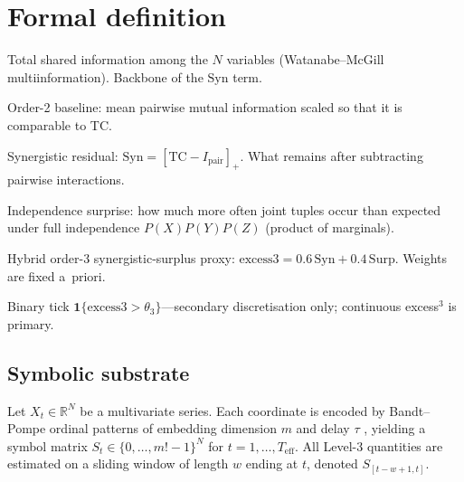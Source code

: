 \documentclass[11pt,a4paper]{article}
\begin{document}
\section{Formal definition}
\label{sec:definition}

\begin{tcolorbox}[
  colback=blue!5!white,
  colframe=blue!75!black,
  title={\textbf{Key definitions for excess$^3$}},
  fonttitle=\bfseries,
  boxrule=0.8pt,
  left=4pt,right=4pt,top=2pt,bottom=2pt,
  label=box:keydefs
]
\begin{description}[leftmargin=2.2em,itemsep=3pt,parsep=0pt,topsep=2pt]
  \item[TC (Total Correlation)]
    Total shared information among the $N$ variables
    (Watanabe--McGill multiinformation). Backbone of the $\mathrm{Syn}$ term.
  \item[$I_{\mathrm{pair}}$]
    Order-2 baseline: mean pairwise mutual information scaled so that it is
    comparable to TC.
  \item[Syn]
    Synergistic residual:
    $\mathrm{Syn}=[\mathrm{TC}-I_{\mathrm{pair}}]_+$.
    What remains after subtracting pairwise interactions.
  \item[Surp]
    Independence surprise: how much more often joint tuples occur than
    expected under full independence $P(X)P(Y)P(Z)$ (product of marginals).
  \item[excess$^3$]
    Hybrid order-3 synergistic-surplus proxy:
    $\mathrm{excess3}=0.6\,\mathrm{Syn}+0.4\,\mathrm{Surp}$.
    Weights are fixed a~priori.
  \item[$\Phi_3$]
    Binary tick $\mathbf{1}\{\mathrm{excess3}>\theta_3\}$---secondary
    discretisation only; continuous excess$^3$ is primary.
\end{description}
\end{tcolorbox}

\subsection{Symbolic substrate}
\label{sec:symbols}

Let $X_t\in\mathbb{R}^N$ be a multivariate series. Each coordinate is
encoded by Bandt--Pompe ordinal patterns of embedding dimension $m$ and
delay $\tau$ \citep{BandtPompe2002,Amigo2010}, yielding a symbol matrix
$S_t\in\{0,\ldots,m!-1\}^N$ for $t=1,\ldots,T_{\mathrm{eff}}$. All Level-3
quantities are estimated on a sliding window of length $w$ ending at $t$,
denoted $S_{[t-w+1,t]}$.
\end{document}
